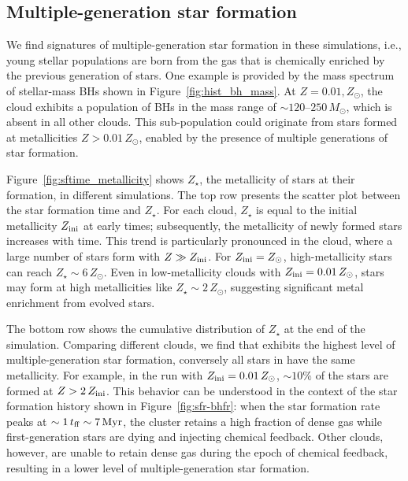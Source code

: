\documentclass[twocolumn]{aastex631}
\begin{document}
\subsection{Multiple-generation star formation}

We find signatures of multiple-generation star formation in these simulations, i.e., young stellar populations are born from the gas that is chemically enriched by the previous generation of stars. One example is provided by the mass spectrum of stellar-mass BHs shown in Figure~\ref{fig:hist_bh_mass}. At $Z=0.01,Z_\odot$, the  cloud exhibits a population of BHs in the mass range of $\sim 120$--$250\,M_\odot$, which is absent in all other clouds. This sub-population could originate from stars formed at metallicities $Z>0.01\,Z_\odot$, enabled by the presence of multiple generations of star formation.

Figure~\ref{fig:sftime_metallicity} shows $Z_\star$, the metallicity of stars at their formation, in different simulations. The top row presents the scatter plot between the star formation time and $Z_\star$. For each cloud, $Z_\star$ is equal to the initial metallicity $Z_{\rm ini}$ at early times; subsequently, the metallicity of newly formed stars increases with time. This trend is particularly pronounced in the  cloud, where a large number of stars form with $Z \gg Z_{\rm ini}$. For $Z_{\rm ini}=Z_\odot$, high-metallicity stars can reach $Z_\star \sim 6\,Z_\odot$. Even in low-metallicity clouds with $Z_{\rm ini}=0.01\,Z_\odot$, stars may form at high metallicities like $Z_\star \sim 2\, Z_\odot$, suggesting significant metal enrichment from evolved stars.

The bottom row shows the cumulative distribution of $Z_\star$ at the end of the simulation. Comparing different clouds, we find that  exhibits the highest level of multiple-generation star formation, conversely all stars in  have the same metallicity. For example, in the run with $Z_{\rm ini}=0.01\,Z_\odot$, $\sim 10\%$ of the stars are formed at $Z > 2\,Z_{\rm ini}$. This behavior can be understood in the context of the star formation history shown in Figure~\ref{fig:sfr-bhfr}: when the star formation rate peaks at $\sim 1\,t_{\rm ff} \sim 7\,\rm Myr$, the cluster retains a high fraction of dense gas while first-generation stars are dying and injecting chemical feedback. Other clouds, however, are unable to retain dense gas during the epoch of chemical feedback, resulting in a lower level of multiple-generation star formation.
\end{document}
